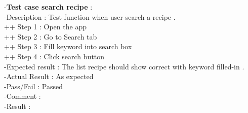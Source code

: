 \documentclass{article}
\begin{document}
    
     -\textbf{Test case search recipe }: \\
    -Description : Test function when user search a recipe . \\
    ++ Step 1 : Open the app  \\
    ++ Step 2 : Go to Search tab \\
    ++ Step 3 : Fill keyword into search box  \\
    ++ Step 4 : Click search button  \\
    -Expected result : The list recipe should show correct with keyword filled-in . \\
    -Actual Result : As expected \\
    -Pass/Fail : Passed \\
    -Comment :  \\
    -Result : 
    \begin{figure}[h!]
    \centering

\end{figure}
\end{document}
